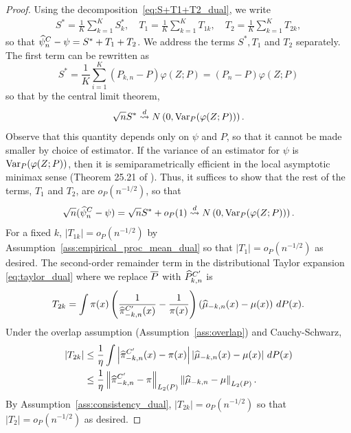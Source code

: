 \begin{proof}
Using the decomposition~\eqref{eq:S+T1+T2_dual}, we write 
\begin{align}
S^*=\frac{1}{K}\sum_{k=1}^K S^*_k,  \hspace{1em}
T_1=\frac{1}{K}\sum_{k=1}^K T_{1k},  \hspace{1em}
T_2=\frac{1}{K}\sum_{k=1}^K T_{2k},
\end{align}
so that
$\widehat{\psi}^C_{n} - \psi = S^* + T_1 + T_2$.
We address the terms $S^*,T_1$ and $T_2$ separately. The first term can be rewritten as
$$
S^* = \frac{1}{K}\sum_{i=1}^K (P_{k,n}-P)\varphi(Z;P) = (P_n-P)\varphi(Z;P)
$$
so that by the central limit theorem, 
$$
\sqrt{n}S^* \stackrel{d}{\rightsquigarrow} {N}\left(0, {\rm Var}_P(\varphi(Z;P))\right).
$$ 
Observe that this quantity depends only on $\psi$ and $P$, so that it cannot be made smaller by choice of estimator. 
If the variance of an estimator for $\psi$ is ${\rm Var}_P(\varphi(Z;P))$, then it is semiparametrically efficient in the local asymptotic minimax sense (Theorem 25.21 of \cite{van2000asymptotic}). 
Thus,  it suffices to show that the rest of the terms, $T_1$ and $T_2$, are $o_P(n^{-1/2})$, so that
$$
\sqrt{n}(\widehat{\psi}^C_n - \psi)=\sqrt{n} S^*+o_P(1)\stackrel{d}{\rightsquigarrow} {N}\left(0, {\rm Var}_P (\varphi(Z;P))\right)
.$$
For a fixed $k$,
$|T_{1k}|=o_P(n^{-1/2})$ 
by Assumption~\ref{ass:empirical_proc_mean_dual}
so that $|T_1|=o_P(n^{-1/2})$ as desired. 
The second-order remainder term in the distributional Taylor expansion \eqref{eq:taylor_dual} where
we replace $\overline{P}$ with $\widehat{P}^{C'}_{k,n}$
is
$$
T_{2k} = \int \pi(x) \left( \frac{1}{\widehat{\pi}^{C'}_{-k,n}(x)} - \frac{1}{\pi(x)} \right) \left( \widehat{\mu}_{-k,n}(x) - \mu(x) \right) \, dP(x)
.$$
Under the overlap assumption (Assumption~\ref{ass:overlap}) and  Cauchy-Schwarz, 
\begin{align}
    |T_{2k}| &\leq \frac{1}{\eta} \int \left| \widehat{\pi}^{C'}_{-k,n}(x) - \pi(x) \right| \left| \widehat{\mu}_{-k,n}(x) - \mu(x) \right| \, dP(x) \nonumber \\
    &\leq \frac{1}{\eta} \left\|\widehat{\pi}^{C'}_{-k,n} -\pi\right\|_{L_2(P)} \left\|\widehat{\mu}_{-k,n} - \mu\right\|_{L_2(P)}. \label{eq:T2_cauchy_schwarz_dual}
\end{align}
By Assumption~\ref{ass:consistency_dual},
$|T_{2k}|=o_P(n^{-1/2})$
so that 
$|T_{2}|=o_P(n^{-1/2})$ as desired. 
\end{proof}
